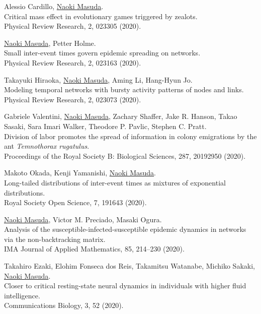 \documentclass[11pt,letter]{article}
\begin{document}
\begin{etaremune}
\item Alessio Cardillo, \underline{Naoki Masuda}.\\
Critical mass effect in evolutionary games triggered by zealots.\\
Physical Review Research, 2, 023305 (2020).

\item \underline{Naoki Masuda}, Petter Holme.\\
Small inter-event times govern epidemic spreading on networks.\\
Physical Review Research, 2, 023163 (2020).

\item Takayuki Hiraoka, \underline{Naoki Masuda}, Aming Li, Hang-Hyun Jo.\\
Modeling temporal networks with bursty activity patterns of nodes and links.\\
Physical Review Research, 2, 023073 (2020).

\item Gabriele Valentini, \underline{Naoki Masuda}, Zachary Shaffer, Jake R. Hanson, Takao Sasaki, Sara Imari Walker, Theodore P. Pavlic, Stephen C. Pratt.\\
Division of labor promotes the spread of information in colony emigrations by the ant \textit{Temnothorax rugatulus}.\\
Proceedings of the Royal Society B: Biological Sciences, 287, 20192950 (2020).

\item Makoto Okada, Kenji Yamanishi, \underline{Naoki Masuda}.\\
Long-tailed distributions of inter-event times as mixtures of exponential distributions.\\
Royal Society Open Science, 7, 191643 (2020).

\item \underline{Naoki Masuda}, Victor M. Preciado, Masaki Ogura.\\
Analysis of the susceptible-infected-susceptible epidemic dynamics in networks via the non-backtracking matrix.\\
IMA Journal of Applied Mathematics, 85, 214--230 (2020).

\item Takahiro Ezaki, Elohim Fonseca dos Reis, Takamitsu Watanabe, Michiko Sakaki, \underline{Naoki Masuda}.\\
Closer to critical resting-state neural dynamics in individuals with higher fluid intelligence.\\
Communications Biology, 3, 52 (2020).


\end{etaremune}
\end{document}
